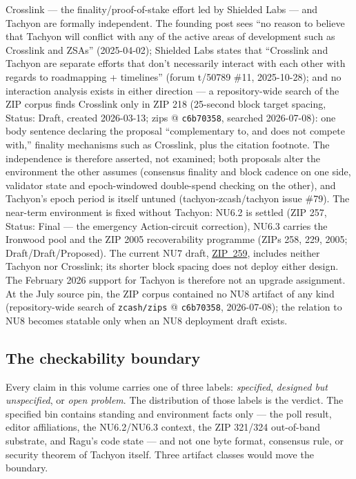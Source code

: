 \documentclass[11pt,a4paper]{article}
\theoremstyle{definition}
\begin{document}
Crosslink --- the finality/proof-of-stake effort led by Shielded Labs ---
and Tachyon are formally independent. The founding post sees ``no reason to
believe that Tachyon will conflict with any of the active areas of
development such as Crosslink and ZSAs'' (2025-04-02);
Shielded Labs states that ``Crosslink and Tachyon are separate efforts that
don't necessarily interact with each other with regards to roadmapping +
timelines'' (forum t/50789 \#11, 2025-10-28); and no interaction analysis
exists in either direction --- a repository-wide search of the ZIP corpus
finds Crosslink only in ZIP 218 (25-second block target spacing, Status:
Draft, created 2026-03-13; zips @ \texttt{c6b70358}, searched 2026-07-08):
one body sentence declaring the proposal ``complementary to, and does not
compete with,'' finality mechanisms such as Crosslink, plus the citation
footnote. The independence is therefore
asserted, not examined; both proposals alter the environment the other
assumes (consensus finality and block cadence on one side, validator state
and epoch-windowed double-spend checking on the other), and Tachyon's epoch
period is itself untuned (tachyon-zcash/tachyon issue \#79). The near-term
environment is fixed without Tachyon: NU6.2 is settled (ZIP 257, Status:
Final --- the emergency Action-circuit correction), NU6.3 carries the
Ironwood pool and the ZIP 2005 recoverability programme (ZIPs 258, 229,
2005; Draft/Draft/Proposed). The current NU7 draft,
\href{https://zips.z.cash/zip-0259}{ZIP~259}, includes neither Tachyon nor
Crosslink; its shorter block spacing does not deploy either design.
The February 2026 support for Tachyon is therefore not an upgrade
assignment. At the July source pin, the
ZIP corpus contained no NU8 artifact of any kind (repository-wide search of
\texttt{zcash/zips} @ \texttt{c6b70358}, 2026-07-08); the relation to NU8
becomes statable only when an NU8 deployment draft exists.

\subsection{The checkability boundary}\label{sec:tachyon-checkability}

Every claim in this volume carries one of three labels: \emph{specified},
\emph{designed but unspecified}, or \emph{open problem}. The distribution
of those labels is the verdict. The specified bin contains standing and
environment facts only --- the poll result, editor affiliations, the
NU6.2/NU6.3 context, the ZIP 321/324 out-of-band substrate, and Ragu's code
state --- and not one byte format, consensus rule, or security theorem of
Tachyon itself. Three artifact classes would move the boundary.
\end{document}
